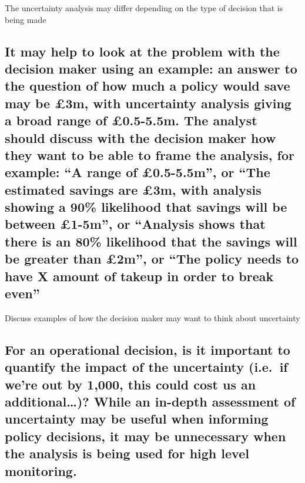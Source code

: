 \documentclass[]{book}
\begin{document}
 The uncertainty analysis may differ depending on the type of decision
that is being made

\subsection{\texorpdfstring{It may help to look at the problem with the
decision maker using an example: an answer to the question of how much a
policy would save may be £3m, with uncertainty analysis giving a broad
range of £0.5-5.5m. The analyst should discuss with the decision maker
how they want to be able to frame the analysis, for example: ``A range
of £0.5-5.5m'', or ``The estimated savings are £3m, with analysis
showing a 90\% likelihood that savings will be between £1-5m'', or
``Analysis shows that there is an 80\% likelihood that the savings will
be greater than £2m'', or ``The policy needs to have X amount of takeup
in order to break
even''}{It may help to look at the problem with the decision maker using an example: an answer to the question of how much a policy would save may be £3m, with uncertainty analysis giving a broad range of £0.5-5.5m. The analyst should discuss with the decision maker how they want to be able to frame the analysis, for example:   A range of £0.5-5.5m, or   The estimated savings are £3m, with analysis showing a 90\% likelihood that savings will be between £1-5m, or   Analysis shows that there is an 80\% likelihood that the savings will be greater than £2m, or   The policy needs to have X amount of takeup in order to break even}}\label{it-may-help-to-look-at-the-problem-with-the-decision-maker-using-an-example-an-answer-to-the-question-of-how-much-a-policy-would-save-may-be-3m-with-uncertainty-analysis-giving-a-broad-range-of-0.5-5.5m.-the-analyst-should-discuss-with-the-decision-maker-how-they-want-to-be-able-to-frame-the-analysis-for-example-a-range-of-0.5-5.5m-or-the-estimated-savings-are-3m-with-analysis-showing-a-90-likelihood-that-savings-will-be-between-1-5m-or-analysis-shows-that-there-is-an-80-likelihood-that-the-savings-will-be-greater-than-2m-or-the-policy-needs-to-have-x-amount-of-takeup-in-order-to-break-even}

 Discuss examples of how the decision maker may want to think about
uncertainty

\subsection{For an operational decision, is it important to quantify the
impact of the uncertainty (i.e.~if we're out by 1,000, this could cost
us an additional\ldots{})? While an in-depth assessment of uncertainty
may be useful when informing policy decisions, it may be unnecessary
when the analysis is being used for high level
monitoring.}\label{for-an-operational-decision-is-it-important-to-quantify-the-impact-of-the-uncertainty-i.e.if-were-out-by-1000-this-could-cost-us-an-additional-while-an-in-depth-assessment-of-uncertainty-may-be-useful-when-informing-policy-decisions-it-may-be-unnecessary-when-the-analysis-is-being-used-for-high-level-monitoring.}
\end{document}

